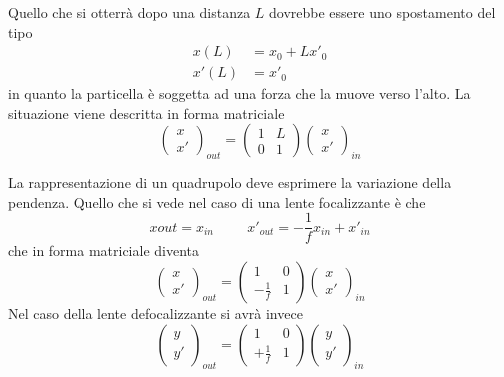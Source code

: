 Quello che si otterrà dopo una distanza $L$ dovrebbe essere uno spostamento del tipo
\begin{equation}
\begin{split}
x(L) & =x_0+Lx'_0\\
x'(L) & =x'_0
\end{split}
\end{equation}
in quanto la particella è soggetta ad una forza che la muove verso l'alto.
La situazione viene descritta in forma matriciale
\begin{equation}
\begin{pmatrix}
x\\x'
\end{pmatrix}_{out}
=
\begin{pmatrix}
1&L\\0&1
\end{pmatrix}
\begin{pmatrix}
x\\x'
\end{pmatrix}_{in}
\end{equation}

La rappresentazione di un quadrupolo deve esprimere la variazione della pendenza.
Quello che si vede nel caso di una lente focalizzante è che 
\begin{equation}
x{out}=x_{in}\hspace{1cm}x'_{out}=-\frac{1}{f}x_{in}+x'_{in}
\end{equation}
che in forma matriciale diventa
\begin{equation}
\begin{pmatrix}
x\\x'
\end{pmatrix}_{out}
=\begin{pmatrix}
1&0\\-\frac{1}{f}&1
\end{pmatrix}
\begin{pmatrix}
x\\x'
\end{pmatrix}_{in}
\end{equation}
Nel caso della lente defocalizzante si avrà invece
\begin{equation}
\begin{pmatrix}
y\\y'
\end{pmatrix}_{out}
=\begin{pmatrix}
1&0\\+\frac{1}{f}&1
\end{pmatrix}
\begin{pmatrix}
y\\y'
\end{pmatrix}_{in}
\end{equation}

